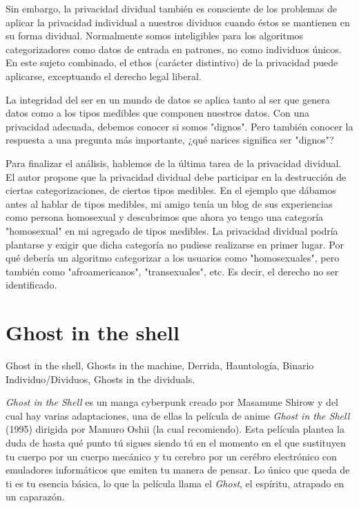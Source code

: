 \documentclass[11pt]{article}
\begin{document}
Sin embargo, la privacidad dividual también es consciente de los problemas de aplicar la privacidad individual a nuestros dividuos cuando éstos se mantienen en su forma dividual. Normalmente somos inteligibles para los algoritmos categorizadores como datos de entrada en patrones, no como individuos únicos. En este sujeto combinado, el ethos (carácter distintivo) de la privacidad puede aplicarse, exceptuando el derecho legal liberal.

La integridad del ser en un mundo de datos se aplica tanto al ser que genera datos como a los tipos medibles que componen nuestros datos. Con una privacidad adecuada, debemos conocer si somos "dignos". Pero también conocer la respuesta a una pregunta más importante, ¿qué narices significa ser "dignos"?

Para finalizar el análisis, hablemos de la última tarea de la privacidad dividual. El autor propone que la privacidad dividual debe participar en la destrucción de ciertas categorizaciones, de ciertos tipos medibles. En el ejemplo que dábamos antes al hablar de tipos medibles, mi amigo tenía un blog de sus experiencias como persona homosexual y descubrimos que ahora yo tengo una categoría "homosexual" en mi agregado de tipos medibles. La privacidad dividual podría plantarse y exigir que dicha categoría no pudiese realizarse en primer lugar. Por qué debería un algoritmo categorizar a los usuarios como "homosexuales", pero también como "afroamericanos", "transexuales", etc. Es decir, el derecho no ser identificado.
\section{Ghost in the shell}
Ghost in the shell, Ghosts in the machine, Derrida, Hauntología, Binario Individuo/Dividuos, Ghosts in the dividuals.

\textit{Ghost in the Shell} es un manga cyberpunk creado por Masamune Shirow y del cual hay varias adaptaciones, una de ellas la película de anime \textit{Ghost in the Shell} (1995) dirigida por Mamuro Oshii (la cual recomiendo). Esta película plantea la duda de hasta qué punto tú sigues siendo tú en el momento en el que sustituyen tu cuerpo por un cuerpo mecánico y tu cerebro por un cerébro electrónico con emuladores informáticos que emiten tu manera de pensar. Lo único que queda de ti es tu esencia básica, lo que la película llama el \textit{Ghost}, el espíritu, atrapado en un caparazón.
\end{document}
